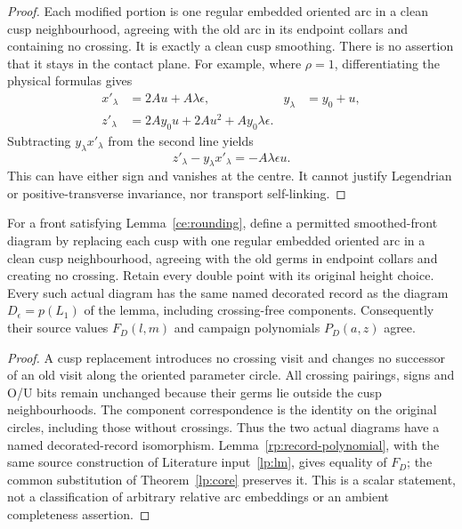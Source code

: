 \begin{proof}
Each modified portion is one regular embedded oriented arc in a clean
cusp neighbourhood, agreeing with the old arc in its endpoint collars
and containing no crossing. It is exactly a clean cusp smoothing.
There is no assertion that it stays in the contact plane. For example,
where $\rho=1$, differentiating the physical formulas gives
\begin{align}
 x'_\lambda&=2Au+A\lambda\epsilon,
 &y_\lambda&=y_0+u,\label{ce:contact-derivatives}\\
 z'_\lambda&=2Ay_0u+2Au^2+Ay_0\lambda\epsilon.
 \label{ce:contact-z-derivative}
\end{align}
Subtracting $y_\lambda x'_\lambda$ from the second line yields
\begin{equation}\label{ce:ordinary-not-contact}
 z'_\lambda-y_\lambda x'_\lambda=-A\lambda\epsilon u.
\end{equation}
This can have either sign and vanishes at the centre. It cannot justify
Legendrian or positive-transverse invariance, nor transport self-linking.
\end{proof}

\begin{corollary}
\label{ce:smoothing-record}\leanok
For a front satisfying Lemma~\ref{ce:rounding}, define a permitted
smoothed-front diagram by replacing each cusp with one regular embedded
oriented arc in a clean cusp neighbourhood, agreeing with the old germs
in endpoint collars and creating no crossing. Retain every double point
with its original height choice. Every such actual diagram has the same
named decorated record as the diagram $D_\epsilon=p(L_1)$ of the lemma,
including crossing-free components. Consequently their source values
$F_D(l,m)$ and campaign polynomials $P_D(a,z)$ agree.

\end{corollary}
\begin{proof}\leanok{}
A cusp replacement introduces no crossing visit and changes no successor
of an old visit along the oriented parameter circle. All crossing
pairings, signs and O/U bits remain unchanged because their germs lie
outside the cusp neighbourhoods. The component correspondence is the
identity on the original circles, including those without crossings.
Thus the two actual diagrams have a named decorated-record isomorphism.
Lemma~\ref{rp:record-polynomial}, with the same source construction of
Literature input~\ref{lp:lm}, gives equality of $F_D$; the common substitution
of Theorem~\ref{lp:core} preserves it. This is a scalar statement, not
a classification of arbitrary relative arc embeddings or an ambient
completeness assertion.
\end{proof}

